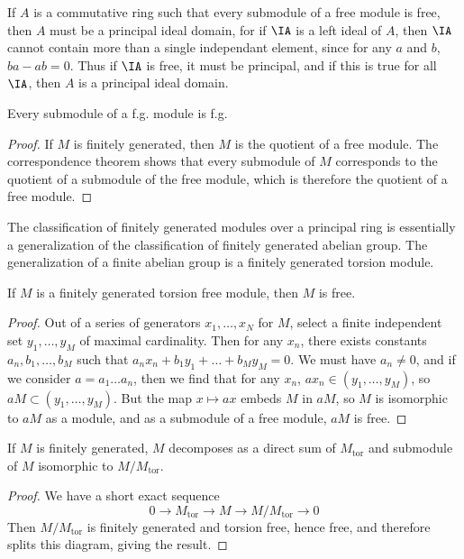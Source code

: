 If $A$ is a commutative ring such that every submodule of a free module is free, then $A$ must be a principal ideal domain, for if $\IA$ is a left ideal of $A$, then $\IA$ cannot contain more than a single independant element, since for any $a$ and $b$, $ba - ab = 0$. Thus if $\IA$ is free, it must be principal, and if this is true for all $\IA$, then $A$ is a principal ideal domain.

\begin{corollary}
    Every submodule of a f.g. module is f.g.
\end{corollary}
\begin{proof}
    If $M$ is finitely generated, then $M$ is the quotient of a free module. The correspondence theorem shows that every submodule of $M$ corresponds to the quotient of a submodule of the free module, which is therefore the quotient of a free module.
\end{proof}

The classification of finitely generated modules over a principal ring is essentially a generalization of the classification of finitely generated abelian group. The generalization of a finite abelian group is a finitely generated torsion module.

\begin{lemma}
    If $M$ is a finitely generated torsion free module, then $M$ is free.
\end{lemma}
\begin{proof}
    Out of a series of generators $x_1, \dots, x_N$ for $M$, select a finite independent set $y_1, \dots, y_M$ of maximal cardinality. Then for any $x_n$, there exists constants $a_n,b_1, \dots, b_M$ such that $a_nx_n + b_1y_1 + \dots + b_My_M = 0$. We must have $a_n \neq 0$, and if we consider $a = a_1 \dots a_n$, then we find that for any $x_n$, $ax_n \in (y_1, \dots, y_M)$, so $aM \subset (y_1, \dots, y_M)$. But the map $x \mapsto ax$ embeds $M$ in $aM$, so $M$ is isomorphic to $aM$ as a module, and as a submodule of a free module, $aM$ is free.
\end{proof}

\begin{theorem}
    If $M$ is finitely generated, $M$ decomposes as a direct sum of $M_{\text{tor}}$ and submodule of $M$ isomorphic to $M/M_{\text{tor}}$.
\end{theorem}
\begin{proof}
    We have a short exact sequence
    \[ 0 \to M_{\text{tor}} \to M \to M/M_{\text{tor}} \to 0 \]
    Then $M/M_{\text{tor}}$ is finitely generated and torsion free, hence free, and therefore splits this diagram, giving the result.
\end{proof}

